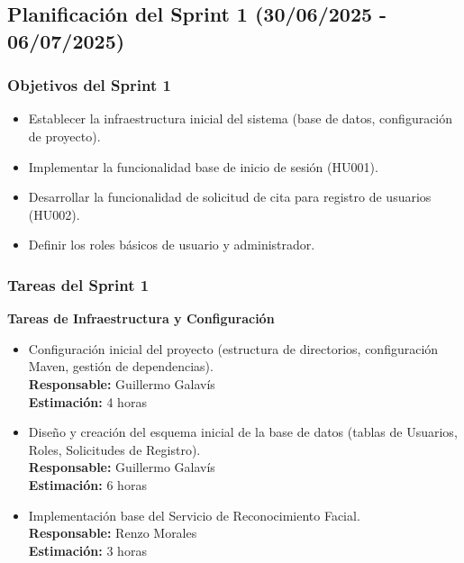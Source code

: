 \documentclass[12pt]{article}
\begin{document}
\subsection{Planificación del Sprint 1 (30/06/2025 - 06/07/2025)}

\subsubsection{Objetivos del Sprint 1}
\begin{itemize}
	\item Establecer la infraestructura inicial del sistema (base de datos, configuración de proyecto).
	\item Implementar la funcionalidad base de inicio de sesión (HU001).
	\item Desarrollar la funcionalidad de solicitud de cita para registro de usuarios (HU002).
	\item Definir los roles básicos de usuario y administrador.
\end{itemize}

\subsubsection{Tareas del Sprint 1}
\textbf{Tareas de Infraestructura y Configuración}
\begin{itemize}
	\item Configuración inicial del proyecto (estructura de directorios, configuración Maven, gestión de dependencias). \\
	\textbf{Responsable:} Guillermo Galavís \\
	\textbf{Estimación:} 4 horas
	\item Diseño y creación del esquema inicial de la base de datos (tablas de Usuarios, Roles, Solicitudes de Registro). \\
	\textbf{Responsable:} Guillermo Galavís \\
	\textbf{Estimación:} 6 horas
	\item Implementación base del Servicio de Reconocimiento Facial. \\
	\textbf{Responsable:} Renzo Morales \\
	\textbf{Estimación:} 3 horas
\end{itemize}
\end{document}
